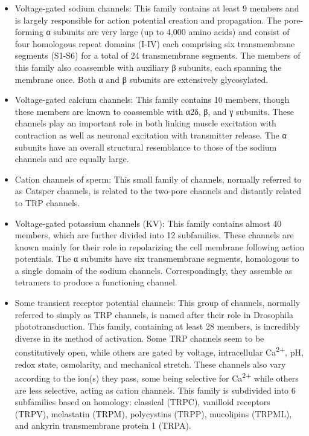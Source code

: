 \begin{itemize}
\tightlist
\item
  Voltage-gated sodium channels: This family contains at least 9 members and is largely responsible for action potential creation and propagation. The pore-forming α subunits are very large (up to 4,000 amino acids) and consist of four homologous repeat domains (I-IV) each comprising six transmembrane segments (S1-S6) for a total of 24 transmembrane segments. The members of this family also coassemble with auxiliary β subunits, each spanning the membrane once. Both α and β subunits are extensively glycosylated.
\item
  Voltage-gated calcium channels: This family contains 10 members, though these members are known to coassemble with α2δ, β, and γ subunits. These channels play an important role in both linking muscle excitation with contraction as well as neuronal excitation with transmitter release. The α subunits have an overall structural resemblance to those of the sodium channels and are equally large.
\item
  Cation channels of sperm: This small family of channels, normally referred to as Catsper channels, is related to the two-pore channels and distantly related to TRP channels.
\item
  Voltage-gated potassium channels (KV): This family contains almost 40 members, which are further divided into 12 subfamilies. These channels are known mainly for their role in repolarizing the cell membrane following action potentials. The α subunits have six transmembrane segments, homologous to a single domain of the sodium channels. Correspondingly, they assemble as tetramers to produce a functioning channel.
\item
  Some transient receptor potential channels: This group of channels, normally referred to simply as TRP channels, is named after their role in Drosophila phototransduction. This family, containing at least 28 members, is incredibly diverse in its method of activation. Some TRP channels seem to be constitutively open, while others are gated by voltage, intracellular Ca\textsuperscript{2+}, pH, redox state, osmolarity, and mechanical stretch. These channels also vary according to the ion(s) they pass, some being selective for Ca\textsuperscript{2+} while others are less selective, acting as cation channels. This family is subdivided into 6 subfamilies based on homology: classical (TRPC), vanilloid receptors (TRPV), melastatin (TRPM), polycystins (TRPP), mucolipins (TRPML), and ankyrin transmembrane protein 1 (TRPA).

\end{itemize}
